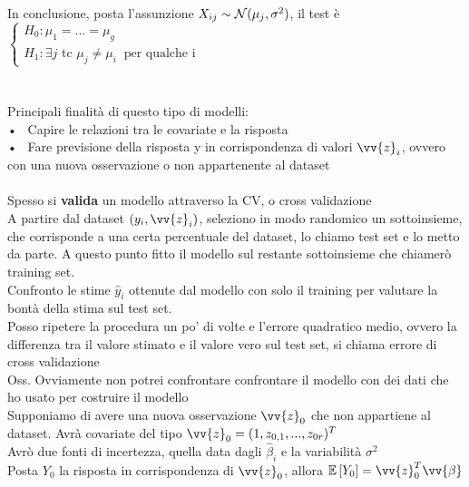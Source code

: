 In conclusione, posta l'assunzione $X_{ij}\sim \mathcal N(\mu_j,\sigma^2)$, il test è $\begin{cases}
    H_0 : \mu_1=...=\mu_g\\
    H_1 : \exists j \text{ tc } \mu_j\ne \mu_i \ \text{ per qualche i}
\end{cases}$\\ \\

\\

Principali finalità di questo tipo di modelli:\\
• \ Capire le relazioni tra le covariate e la risposta\\
• \ Fare previsione della risposta y in corrispondenza di valori $\vv{z}_i$, ovvero con una nuova osservazione o non appartenente al dataset\\ \\

Spesso si \textbf{valida} un modello attraverso la CV, o cross validazione\\

A partire dal dataset $(y_i,\vv{z}_i)$, seleziono in modo randomico un sottoinsieme, che corrisponde a una certa percentuale del dataset, lo chiamo test set e lo metto da parte. A questo punto fitto il modello sul restante sottoinsieme che chiamerò training set.\\
Confronto le stime $\hat{y}_i$ ottenute dal modello con solo il training per valutare la bontà della stima sul test set.\\

Posso ripetere la procedura un po' di volte e l'errore quadratico medio, ovvero la differenza tra il valore stimato e il valore vero sul test set, si chiama errore di cross validazione\\

Oss. Ovviamente non potrei confrontare confrontare il modello con dei dati che ho usato per costruire il modello \\


Supponiamo di avere una nuova osservazione $\vv{z}_0$ che non appartiene al dataset. Avrà covariate del tipo $\vv{z}_0=(1,z_{0,1},...,z_{0r})^T$\\

Avrò due fonti di incertezza, quella data dagli $\hat{\beta}_i$ e la variabilità $\sigma^2$\\
Posta $Y_0$ la risposta in corrispondenza di $\vv{z}_0$, allora $\E{Y_0}=\vv{z}_0^T\vv{\beta}$


